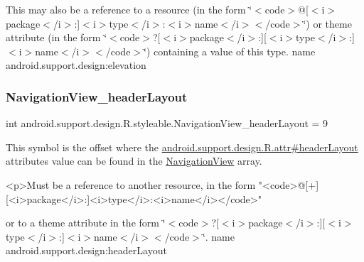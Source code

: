 This may also be a reference to a resource (in the form \char`\"{}$<$code$>$@\mbox{[}$<$i$>$package$<$/i$>$\+:\mbox{]}$<$i$>$type$<$/i$>$\+:$<$i$>$name$<$/i$>$$<$/code$>$\char`\"{}) or theme attribute (in the form \char`\"{}$<$code$>$?\mbox{[}$<$i$>$package$<$/i$>$\+:\mbox{]}\mbox{[}$<$i$>$type$<$/i$>$\+:\mbox{]}$<$i$>$name$<$/i$>$$<$/code$>$\char`\"{}) containing a value of this type.  name android.\+support.\+design\+:elevation \mbox{\label{classandroid_1_1support_1_1design_1_1R_1_1styleable_a08ec1aafadcca65cbe363af269714f38}} 
\subsubsection{\texorpdfstring{Navigation\+View\+\_\+header\+Layout}{NavigationView\_headerLayout}}
{\footnotesize\ttfamily int android.\+support.\+design.\+R.\+styleable.\+Navigation\+View\+\_\+header\+Layout = 9\hspace{0.3cm}{\ttfamily [static]}}

This symbol is the offset where the \hyperlink{classandroid_1_1support_1_1design_1_1R_1_1attr_a49a77c4653b1f3d4066e9f8f6fe5cb65}{android.\+support.\+design.\+R.\+attr\#header\+Layout} attribute\textquotesingle{}s value can be found in the \hyperlink{classandroid_1_1support_1_1design_1_1R_1_1styleable_a277c199f371e8804c26e2cd6dbf88999}{Navigation\+View} array.

\begin{DoxyVerb}      <p>Must be a reference to another resource, in the form "<code>@[+][<i>package</i>:]<i>type</i>:<i>name</i></code>"
\end{DoxyVerb}
 or to a theme attribute in the form \char`\"{}$<$code$>$?\mbox{[}$<$i$>$package$<$/i$>$\+:\mbox{]}\mbox{[}$<$i$>$type$<$/i$>$\+:\mbox{]}$<$i$>$name$<$/i$>$$<$/code$>$\char`\"{}.  name android.\+support.\+design\+:header\+Layout \mbox{\label{classandroid_1_1support_1_1design_1_1R_1_1styleable_a5dcfbed64b1824f484b663ac8f7e2ef1}} 
